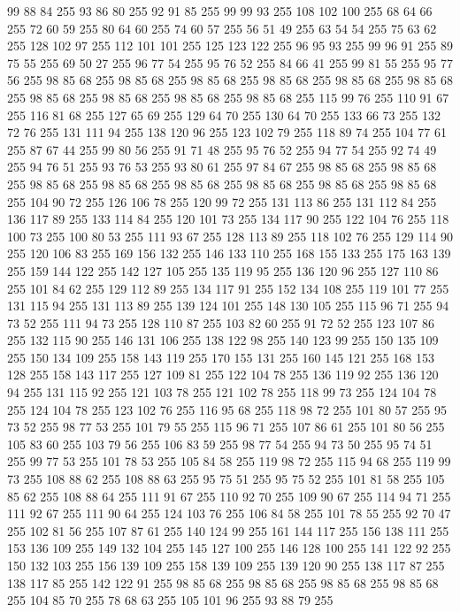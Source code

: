 99 88 84 255 93 86 80 255 92 91 85 255 99 99 93 255 108 102 100 255 68 64 66 255 72 60 59 255 80 64 60 255 74 60 57 255 56 51 49 255 63 54 54 255 75 63 62 255 128 102 97 255 112 101 101 255 125 123 122 255 96 95 93 255 99 96 91 255 89 75 55 255 69 50 27 255 96 77 54 255 95 76 52 255 84 66 41 255 99 81 55 255 95 77 56 255 98 85 68 255 98 85 68 255 98 85 68 255 98 85 68 255 98 85 68 255 98 85 68 255 98 85 68 255 98 85 68 255 98 85 68 255 98 85 68 255 115 99 76 255 110 91 67 255 116 81 68 255 127 65 69 255 129 64 70 255 130 64 70 255 133 66 73 255 132 72 76 255 131 111 94 255 138 120 96 255 123 102 79 255 118 89 74 255 104 77 61 255 87 67 44 255 99 80 56 255 91 71 48 255 95 76 52 255 94 77 54 255 92 74 49 255 94 76 51 255 93 76 53 255 93 80 61 255 97 84 67 255 98 85 68 255 98 85 68 255 98 85 68 255 98 85 68 255 98 85 68 255 98 85 68 255 98 85 68 255
98 85 68 255 104 90 72 255 126 106 78 255 120 99 72 255 131 113 86 255 131 112 84 255 136 117 89 255 133 114 84 255 120 101 73 255 134 117 90 255 122 104 76 255 118 100 73 255 100 80 53 255 111 93 67 255 128 113 89 255 118 102 76 255 129 114 90 255 120 106 83 255 169 156 132 255 146 133 110 255 168 155 133 255 175 163 139 255 159 144 122 255 142 127 105 255 135 119 95 255 136 120 96 255 127 110 86 255 101 84 62 255 129 112 89 255 134 117 91 255 152 134 108 255 119 101 77 255 131 115 94 255 131 113 89 255 139 124 101 255 148 130 105 255 115 96 71 255 94 73 52 255 111 94 73 255 128 110 87 255 103 82 60 255 91 72 52 255 123 107 86 255 132 115 90 255 146 131 106 255 138 122 98 255 140 123 99 255 150 135 109 255 150 134 109 255 158 143 119 255 170 155 131 255 160 145 121 255 168 153 128 255 158 143 117 255 127 109 81 255 122 104 78 255 136 119 92 255 136 120 94 255 131 115 92 255 121 103 78 255 121 102 78 255 118 99 73 255 124 104 78 255 124 104 78 255
123 102 76 255 116 95 68 255 118 98 72 255 101 80 57 255 95 73 52 255 98 77 53 255 101 79 55 255 115 96 71 255 107 86 61 255 101 80 56 255 105 83 60 255 103 79 56 255 106 83 59 255 98 77 54 255 94 73 50 255 95 74 51 255 99 77 53 255 101 78 53 255 105 84 58 255 119 98 72 255 115 94 68 255 119 99 73 255 108 88 62 255 108 88 63 255 95 75 51 255 95 75 52 255 101 81 58 255 105 85 62 255 108 88 64 255 111 91 67 255 110 92 70 255 109 90 67 255 114 94 71 255 111 92 67 255 111 90 64 255 124 103 76 255 106 84 58 255 101 78 55 255 92 70 47 255 102 81 56 255 107 87 61 255 140 124 99 255 161 144 117 255 156 138 111 255 153 136 109 255 149 132 104 255 145 127 100 255 146 128 100 255 141 122 92 255 150 132 103 255 156 139 109 255 158 139 109 255 139 120 90 255 138 117 87 255 138 117 85 255 142 122 91 255 98 85 68 255 98 85 68 255 98 85 68 255 98 85 68 255 104 85 70 255 78 68 63 255 105 101 96 255 93 88 79 255
